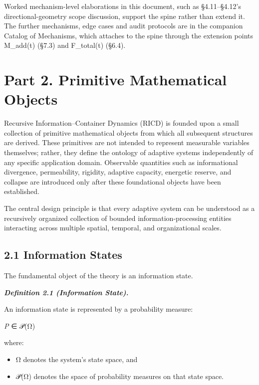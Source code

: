 \documentclass[
]{article}
\begin{document}
Worked mechanism-level elaborations in this document, such as
§4.11--§4.12's directional-geometry scope discussion, support the spine
rather than extend it. The further mechanisms, edge cases and audit
protocols are in the companion Catalog of Mechanisms, which attaches to
the spine through the extension points M\_add(t) (§7.3) and F\_total(t)
(§6.4).

\hypertarget{part-2.-primitive-mathematical-objects}{%
\section{Part 2. Primitive Mathematical
Objects}\label{part-2.-primitive-mathematical-objects}}

Recursive Information--Container Dynamics (RICD) is founded upon a small
collection of primitive mathematical objects from which all subsequent
structures are derived. These primitives are not intended to represent
measurable variables themselves; rather, they define the ontology of
adaptive systems independently of any specific application domain.
Observable quantities such as informational divergence, permeability,
rigidity, adaptive capacity, energetic reserve, and collapse are
introduced only after these foundational objects have been established.

The central design principle is that every adaptive system can be
understood as a recursively organized collection of bounded
information-processing entities interacting across multiple spatial,
temporal, and organizational scales.

\hypertarget{information-states}{%
\subsection{2.1 Information States}\label{information-states}}

The fundamental object of the theory is an information state.

\emph{\textbf{Definition 2.1 (Information State).}}

An information state is represented by a probability measure:

\emph{P} ∈ 𝒫(Ω)

where:

\begin{itemize}
\item
  Ω denotes the system's state space, and
\item
  𝒫(Ω) denotes the space of probability measures on that state space.
\end{itemize}
\end{document}
